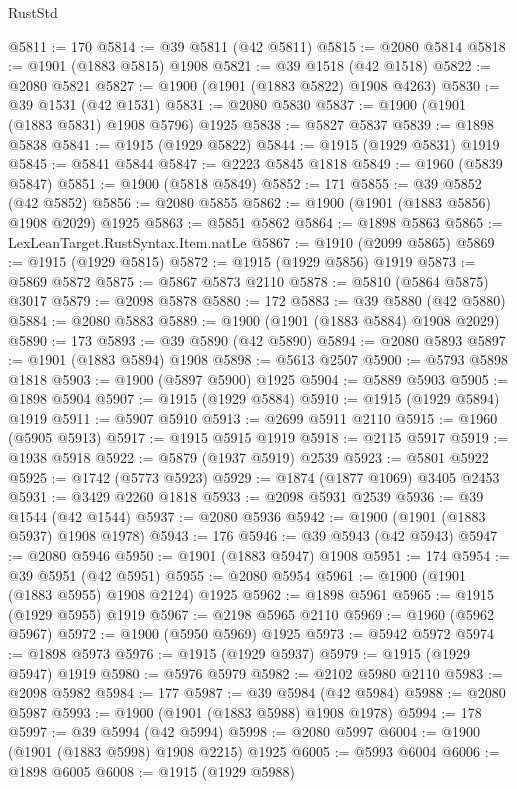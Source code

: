 \begin{lexlean}{RustStd}
\begin{coremodule}
@5811 := 170
@5814 := @39 @5811 (@42 @5811)
@5815 := @2080 @5814
@5818 := @1901 (@1883 @5815) @1908
@5821 := @39 @1518 (@42 @1518)
@5822 := @2080 @5821
@5827 := @1900 (@1901 (@1883 @5822) @1908 @4263)
@5830 := @39 @1531 (@42 @1531)
@5831 := @2080 @5830
@5837 := @1900 (@1901 (@1883 @5831) @1908 @5796) @1925
@5838 := @5827 @5837
@5839 := @1898 @5838
@5841 := @1915 (@1929 @5822)
@5844 := @1915 (@1929 @5831) @1919
@5845 := @5841 @5844
@5847 := @2223 @5845 @1818
@5849 := @1960 (@5839 @5847)
@5851 := @1900 (@5818 @5849)
@5852 := 171
@5855 := @39 @5852 (@42 @5852)
@5856 := @2080 @5855
@5862 := @1900 (@1901 (@1883 @5856) @1908 @2029) @1925
@5863 := @5851 @5862
@5864 := @1898 @5863
@5865 := LexLeanTarget.RustSyntax.Item.natLe
@5867 := @1910 (@2099 @5865)
@5869 := @1915 (@1929 @5815)
@5872 := @1915 (@1929 @5856) @1919
@5873 := @5869 @5872
@5875 := @5867 @5873 @2110
@5878 := @5810 (@5864 @5875) @3017
@5879 := @2098 @5878
@5880 := 172
@5883 := @39 @5880 (@42 @5880)
@5884 := @2080 @5883
@5889 := @1900 (@1901 (@1883 @5884) @1908 @2029)
@5890 := 173
@5893 := @39 @5890 (@42 @5890)
@5894 := @2080 @5893
@5897 := @1901 (@1883 @5894) @1908
@5898 := @5613 @2507
@5900 := @5793 @5898 @1818
@5903 := @1900 (@5897 @5900) @1925
@5904 := @5889 @5903
@5905 := @1898 @5904
@5907 := @1915 (@1929 @5884)
@5910 := @1915 (@1929 @5894) @1919
@5911 := @5907 @5910
@5913 := @2699 @5911 @2110
@5915 := @1960 (@5905 @5913)
@5917 := @1915 @5915 @1919
@5918 := @2115 @5917
@5919 := @1938 @5918
@5922 := @5879 (@1937 @5919) @2539
@5923 := @5801 @5922
@5925 := @1742 (@5773 @5923)
@5929 := @1874 (@1877 @1069) @3405 @2453
@5931 := @3429 @2260 @1818
@5933 := @2098 @5931 @2539
@5936 := @39 @1544 (@42 @1544)
@5937 := @2080 @5936
@5942 := @1900 (@1901 (@1883 @5937) @1908 @1978)
@5943 := 176
@5946 := @39 @5943 (@42 @5943)
@5947 := @2080 @5946
@5950 := @1901 (@1883 @5947) @1908
@5951 := 174
@5954 := @39 @5951 (@42 @5951)
@5955 := @2080 @5954
@5961 := @1900 (@1901 (@1883 @5955) @1908 @2124) @1925
@5962 := @1898 @5961
@5965 := @1915 (@1929 @5955) @1919
@5967 := @2198 @5965 @2110
@5969 := @1960 (@5962 @5967)
@5972 := @1900 (@5950 @5969) @1925
@5973 := @5942 @5972
@5974 := @1898 @5973
@5976 := @1915 (@1929 @5937)
@5979 := @1915 (@1929 @5947) @1919
@5980 := @5976 @5979
@5982 := @2102 @5980 @2110
@5983 := @2098 @5982
@5984 := 177
@5987 := @39 @5984 (@42 @5984)
@5988 := @2080 @5987
@5993 := @1900 (@1901 (@1883 @5988) @1908 @1978)
@5994 := 178
@5997 := @39 @5994 (@42 @5994)
@5998 := @2080 @5997
@6004 := @1900 (@1901 (@1883 @5998) @1908 @2215) @1925
@6005 := @5993 @6004
@6006 := @1898 @6005
@6008 := @1915 (@1929 @5988)

\end{coremodule}
\end{lexlean}
